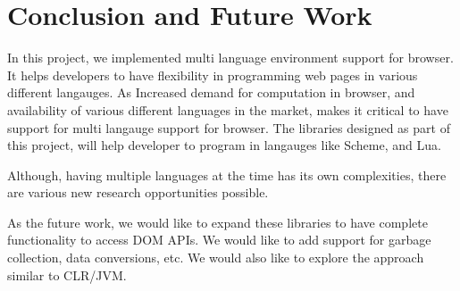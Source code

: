 \chapter{Conclusion and Future Work}

In this project, we implemented multi language environment support for browser.
 It helps developers to have flexibility in programming web pages in various different langauges. As Increased demand for computation in browser, and availability of various different languages in the market, makes it critical to have support for multi langauge support for browser. The libraries designed as part of this project, will help developer to program in langauges like Scheme, and Lua. 
 
 Although, having multiple languages at the time has its own complexities, there are various new research opportunities possible. 

As the future work, we would like to expand these libraries to have complete functionality to access DOM APIs. We would like to add support for garbage collection, data conversions, etc. We would also like to explore the approach similar to CLR/JVM.
